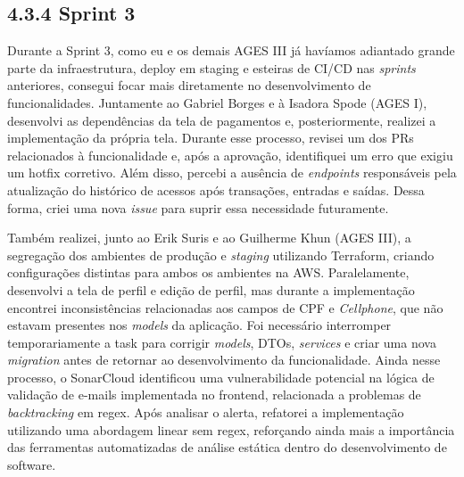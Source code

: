 \hypertarget{__RefHeading___Toc4821_3118176633}{}
\subsection*{4.3.4 Sprint 3}
\label{unit:ages-iii-sprint-3}
\indent \originaltab{}Durante a Sprint 3, como eu e os demais AGES III já havíamos adiantado grande parte da infraestrutura, deploy em staging e esteiras de CI/CD nas \textit{sprints} anteriores, consegui focar mais diretamente no desenvolvimento de funcionalidades. Juntamente ao Gabriel Borges e à Isadora Spode (AGES I), desenvolvi as dependências da tela de pagamentos e, posteriormente, realizei a implementação da própria tela. Durante esse processo, revisei um dos PRs relacionados à funcionalidade e, após a aprovação, identifiquei um erro que exigiu um hotfix corretivo. Além disso, percebi a ausência de \textit{endpoints} responsáveis pela atualização do histórico de acessos após transações, entradas e saídas. Dessa forma, criei uma nova \textit{issue} para suprir essa necessidade futuramente.\par

\indent Também realizei, junto ao Erik Suris e ao Guilherme Khun (AGES III), a segregação dos ambientes de produção e \textit{staging} utilizando Terraform, criando configurações distintas para ambos os ambientes na AWS. Paralelamente, desenvolvi a tela de perfil e edição de perfil, mas durante a implementação encontrei inconsistências relacionadas aos campos de CPF e \textit{Cellphone}, que não estavam presentes nos \textit{models} da aplicação. Foi necessário interromper temporariamente a task para corrigir \textit{models}, DTOs, \textit{services} e criar uma nova \textit{migration} antes de retornar ao desenvolvimento da funcionalidade. Ainda nesse processo, o SonarCloud identificou uma vulnerabilidade potencial na lógica de validação de e-mails implementada no frontend, relacionada a problemas de \textit{backtracking} em regex. Após analisar o alerta, refatorei a implementação utilizando uma abordagem linear sem regex, reforçando ainda mais a importância das ferramentas automatizadas de análise estática dentro do desenvolvimento de software.\par

